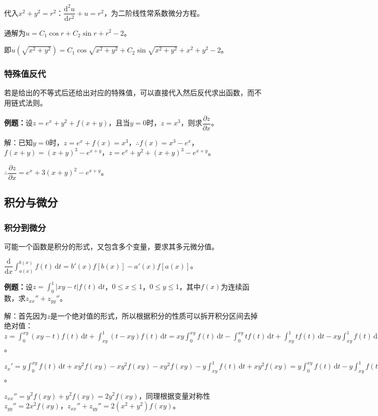 \documentclass[UTF8, 12pt]{ctexart}
\begin{document}
代入$x^2+y^2=r^2$：$\dfrac{\textrm{d}^2u}{\textrm{d}r^2}+u=r^2$，为二阶线性常系数微分方程。

通解为$u=C_1\cos r+C_2\sin r+r^2-2$。

即$u(\sqrt{x^2+y^2})=C_1\cos\sqrt{x^2+y^2}+C_2\sin\sqrt{x^2+y^2}+x^2+y^2-2$。

\subsubsection{特殊值反代}

若是给出的不等式后还给出对应的特殊值，可以直接代入然后反代求出函数，而不用链式法则。

\textbf{例题：}设$z=e^x+y^2+f(x+y)$，且当$y=0$时，$z=x^3$，则求$\dfrac{\partial z}{\partial x}$。

解：已知$y=0$时，$z=e^x+f(x)=x^3$，$\therefore f(x)=x^3-e^x$，$f(x+y)=(x+y)^3-e^{x+y}$，$z=e^x+y^2+(x+y)^3-e^{x+y}$。

$\therefore\dfrac{\partial z}{\partial x}=e^x+3(x+y)^2-e^{x+y}$。

\subsection{积分与微分}

\subsubsection{积分到微分}

可能一个函数是积分的形式，又包含多个变量，要求其多元微分值。

$\dfrac{\textrm{d}}{\textrm{d}x}\int_{a(x)}^{b(x)}f(t)\,\textrm{d}t=b'(x)f[b(x)]-a'(x)f[a(x)]$。

\textbf{例题：}设$z=\int_0^1\vert xy-t\vert f(t)\,\textrm{d}t$，$0\leqslant x\leqslant1$，$0\leqslant y\leqslant1$，其中$f(x)$为连续函数，求$z_{xx}''+z_{yy}''$。

解：首先因为$z$是一个绝对值的形式，所以根据积分的性质可以拆开积分区间去掉绝对值：$z=\int_0^{xy}(xy-t)f(t)\,\textrm{d}t+\int_{xy}^1(t-xy)f(t)\,\textrm{d}t=xy\int_0^{xy}f(t)\,\textrm{d}t-\int_0^{xy}tf(t)\,\textrm{d}t+\int_{xy}^1tf(t)\,\textrm{d}t-xy\int_{xy}^1f(t)\,\textrm{d}t$。

$z_x'=y\int_0^{xy}f(t)\,\textrm{d}t+xy^2f(xy)-xy^2f(xy)-xy^2f(xy)-y\int_{xy}^1f(t)\,\textrm{d}t+xy^2f(xy)=y\int_0^{xy}f(t)\,\textrm{d}t-y\int_{xy}^1f(t)\,\textrm{d}t$。

$z_{xx}''=y^2f(xy)+y^2f(xy)=2y^2f(xy)$，同理根据变量对称性$z_{yy}''=2x^2f(xy)$，$z_{xx}''+z_{yy}''=2(x^2+y^2)f(xy)$。
\end{document}
